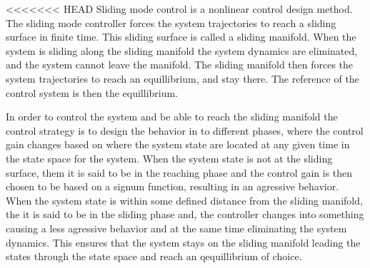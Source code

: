 <<<<<<< HEAD
Sliding mode control is a nonlinear control design method. The sliding mode controller forces the system trajectories to
reach a sliding surface in finite time. This sliding surface is called a sliding manifold. When the system is sliding
along the sliding manifold the system dynamics are eliminated, and the system cannot leave the manifold. The sliding
manifold then forces the system trajectories to reach an equillibrium, and stay there. The reference of the control
system is then the equillibrium. 

In order to control the system and be able to reach the sliding manifold the control strategy is to design the behavior
in to different phases, where the control gain changes based on where the system state are located at any given time in
the state space for the system. When the system state is not at the sliding surface, them it is said to be in the
reaching phase and the control gain is then chosen to be based on a signum function, resulting in an agressive
behavior. When the system state is within some defined distance from the sliding manifold, the it is said to be in the
sliding phase and, the controller changes into something causing a less agressive behavior and at the same time
eliminating the system dynamics. This ensures that the system stays on the sliding manifold leading the states through
the state space and reach an qequillibrium of choice.

